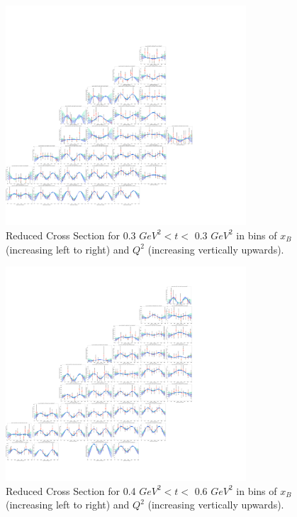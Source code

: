     \begin{figure}[ht]
        \centering
        \includegraphics[trim={14.6cm 4cm 27.2cm 4cm},clip,width=0.8\textwidth]{Chapters/Ch5-Further/c12xsec/combined_t0.3.png}
        \caption[Reduced Cross Section for 0.3 $GeV^2 < t <$ 0.4 $ GeV^2$]{Reduced Cross Section for 0.3 $ GeV^2 < t <$ 0.3 $GeV^2$ in bins of $x_B$ (increasing left to right) and $Q^2$ (increasing vertically upwards). }
        \label{fig:combined_t0.3}
    \end{figure}

    \begin{figure}[ht]
        \centering
        \includegraphics[trim={14.6cm 4cm 27.2cm 4cm},clip,width=0.8\textwidth]{Chapters/Ch5-Further/c12xsec/combined_t0.4.png}
        \caption[Reduced Cross Section for 0.4 $GeV^2 < t <$ 0.6 $ GeV^2$]{Reduced Cross Section for 0.4 $ GeV^2 < t <$ 0.6 $GeV^2$ in bins of $x_B$ (increasing left to right) and $Q^2$ (increasing vertically upwards). }
        \label{fig:combined_t0.4}
    \end{figure}
    
